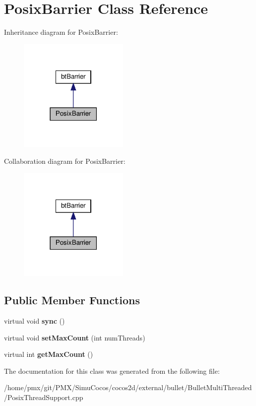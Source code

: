 \hypertarget{classPosixBarrier}{}\section{Posix\+Barrier Class Reference}
\label{classPosixBarrier}


Inheritance diagram for Posix\+Barrier\+:
\nopagebreak
\begin{figure}[H]
\begin{center}
\leavevmode
\includegraphics[width=150pt]{classPosixBarrier__inherit__graph}
\end{center}
\end{figure}


Collaboration diagram for Posix\+Barrier\+:
\nopagebreak
\begin{figure}[H]
\begin{center}
\leavevmode
\includegraphics[width=150pt]{classPosixBarrier__coll__graph}
\end{center}
\end{figure}
\subsection*{Public Member Functions}
\begin{DoxyCompactItemize}
\item 
\mbox{\label{classPosixBarrier_af099b00986e3bc453da5344db7307ec7}} 
virtual void {\bfseries sync} ()
\item 
\mbox{\label{classPosixBarrier_acaea18208ccf29661157fb1dedae5977}} 
virtual void {\bfseries set\+Max\+Count} (int num\+Threads)
\item 
\mbox{\label{classPosixBarrier_a9570155a411d8097f2de8882af803fdc}} 
virtual int {\bfseries get\+Max\+Count} ()
\end{DoxyCompactItemize}


The documentation for this class was generated from the following file\+:\begin{DoxyCompactItemize}
\item 
/home/pmx/git/\+P\+M\+X/\+Simu\+Cocos/cocos2d/external/bullet/\+Bullet\+Multi\+Threaded/Posix\+Thread\+Support.\+cpp\end{DoxyCompactItemize}
